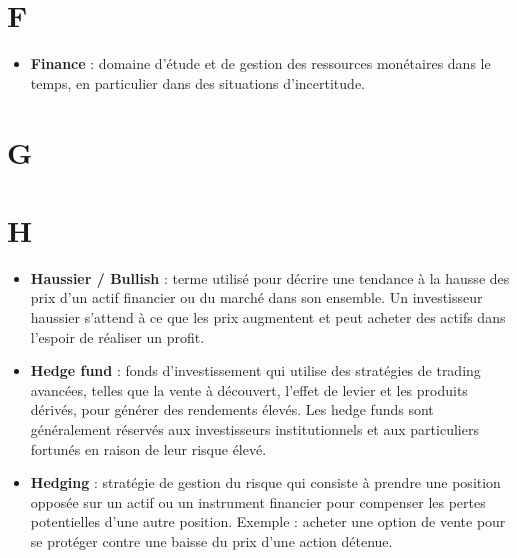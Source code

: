 \documentclass[a4paper,10pt]{article}
\begin{document}
\begin{multicols}{2}
\section*{F}
\begin{itemize}
  \item \textbf{Finance} : domaine d’étude et de gestion des ressources monétaires dans le temps, en particulier dans des situations d’incertitude.
\end{itemize}

\section*{G}

\section*{H}
\begin{itemize}
  \item \textbf{Haussier / Bullish} : terme utilisé pour décrire une tendance à la hausse des prix d’un actif financier ou du marché dans son ensemble. Un investisseur haussier s’attend à ce que les prix augmentent et peut acheter des actifs dans l’espoir de réaliser un profit.
  \item \textbf{Hedge fund} : fonds d’investissement qui utilise des stratégies de trading avancées, telles que la vente à découvert, l’effet de levier et les produits dérivés, pour générer des rendements élevés. Les hedge funds sont généralement réservés aux investisseurs institutionnels et aux particuliers fortunés en raison de leur risque élevé.
  \item \textbf{Hedging} : stratégie de gestion du risque qui consiste à prendre une position opposée sur un actif ou un instrument financier pour compenser les pertes potentielles d’une autre position. Exemple : acheter une option de vente pour se protéger contre une baisse du prix d’une action détenue.
\end{itemize}


\end{multicols}
\end{document}
